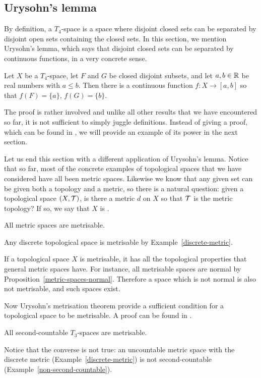 \subsection{Urysohn's lemma}
By definition, a $T_4$-space is a space where disjoint closed sets can be separated by disjoint open sets containing the closed sets. In this section, we mention Urysohn's lemma, which says that disjoint closed sets can be separated by continuous functions, in a very concrete sense.
\begin{lem}
  Let $X$ be a $T_4$-space, let $F$ and $G$ be closed disjoint subsets, and let $a, b \in \mathbb{R}$ be real numbers with $a \leq b$. Then there is a continuous function $f : X \to [a,b]$ so that $f(F) = \{a\}$, $f(G) = \{b\}$.
\end{lem}
The proof is rather involved and unlike all other results that we have encountered so far, it is not sufficient to simply juggle definitions. Instead of giving a proof, which can be found in \cite[\S 33]{Mun}, we will provide an example of its power in the next section.

Let us end this section with a different application of Urysohn's lemma. Notice that so far, most of the concrete examples of topological spaces that we have considered have all been metric spaces. Likewise we know that any given set can be given both a topology and a metric, so there is a natural question: given a topological space $(X,\mathcal{T})$, is there a metric $d$ on $X$ so that $\mathcal{T}$ is the metric topology? If so, we say that $X$ is .
\begin{example}
  All metric spaces are metrisable.
\end{example}
\begin{example}
  Any discrete topological space is metrisable by Example~\ref{discrete-metric}.
\end{example}
If a topological space $X$ is metrisable, it has all the topological properties that general metric spaces have. For instance, all metrisable spaces are normal by Proposition~\ref{metric-spaces-normal}. Therefore a space which is not normal is also not metrisable, and such spaces exist.

Now Urysohn's metrisation theorem provide a sufficient condition for a topological space to be metrisable. A proof can be found in \cite[\S 34]{Mun}.

\begin{thm}
  All second-countable $T_3$-spaces are metrisable.
\end{thm}

Notice that the converse is not true: an uncountable metric space with the discrete metric (Example~\ref{discrete-metric}) is not second-countable (Example~\ref{non-second-countable}).
